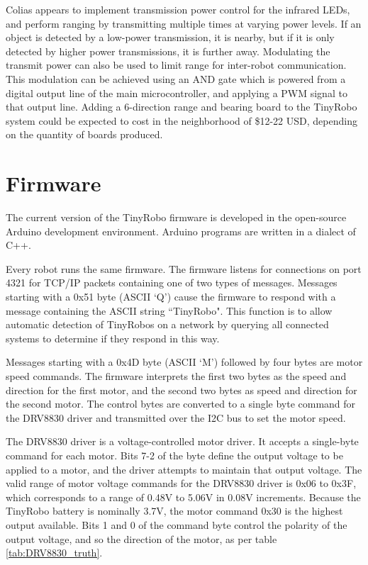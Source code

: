 \documentclass[]{article}
\begin{document}
Colias appears to implement transmission power control for the infrared LEDs, and perform ranging by transmitting multiple times at varying power levels. 
If an object is detected by a low-power transmission, it is nearby, but if it is only detected by higher power transmissions, it is further away. 
Modulating the transmit power can also be used to limit range for inter-robot communication.
This modulation can be achieved using an AND gate which is powered from a digital output line of the main microcontroller, and applying a PWM signal to that output line.
Adding a 6-direction range and bearing board to the TinyRobo system could be expected to cost in the neighborhood of \$12-22 USD, depending on the quantity of boards produced. 
\section {Firmware}

The current version of the TinyRobo firmware is developed in the open-source Arduino development environment.
Arduino programs are written in a dialect of C++. 

Every robot runs the same firmware. 
The firmware listens for connections on port 4321 for TCP/IP packets containing one of two types of messages. 
Messages starting with a 0x51 byte (ASCII `Q') cause the firmware to respond with a message containing the ASCII string ``TinyRobo". 
This function is to allow automatic detection of TinyRobos on a network by querying all connected systems to determine if they respond in this way. 

Messages starting with a 0x4D byte (ASCII `M') followed by four bytes are motor speed commands.
The firmware interprets the first two bytes as the speed and direction for the first motor, and the second two bytes as speed and direction for the second motor.
The control bytes are converted to a single byte command for the DRV8830 driver and transmitted over the I2C bus to set the motor speed.
 
The DRV8830 driver is a voltage-controlled motor driver. 
It accepts a single-byte command for each motor. 
Bits 7-2 of the byte define the output voltage to be applied to a motor, and the driver attempts to maintain that output voltage.
The valid range of motor voltage commands for the DRV8830 driver is 0x06 to 0x3F, which corresponds to a range of 0.48V to 5.06V in 0.08V increments. 
Because the TinyRobo battery is nominally 3.7V, the motor command 0x30 is the highest output available. 
Bits 1 and 0 of the command byte control the polarity of the output voltage, and so the direction of the motor, as per table \ref{tab:DRV8830_truth}.
\end{document}
